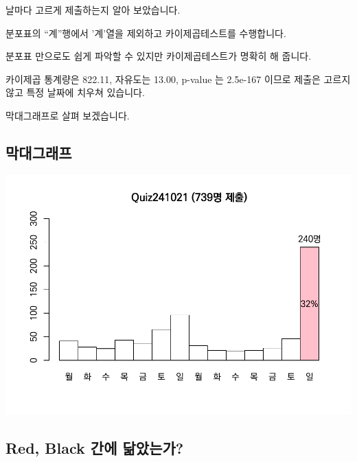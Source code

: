 \documentclass[
]{book}
\begin{document}
날마다 고르게 제출하는지 알아 보았습니다.

분포표의 ``계''행에서 '계'열을 제외하고 카이제곱테스트를 수행합니다.

분포표 만으로도 쉽게 파악할 수 있지만 카이제곱테스트가 명확히 해 줍니다.

카이제곱 통계량은 822.11, 자유도는 13.00, p-value 는 2.5e-167 이므로 제출은 고르지 않고 특정 날짜에 치우쳐 있습니다.

막대그래프로 살펴 보겠습니다.

\subsection{막대그래프}\label{uxb9c9uxb300uxadf8uxb798uxd504-8}

\includegraphics{Quiz_report_2025_files/figure-latex/unnamed-chunk-227-1.pdf}

\subsection{Red, Black 간에 닮았는가?}\label{red-black-uxac04uxc5d0-uxb2eeuxc558uxb294uxac00-7}
\end{document}
